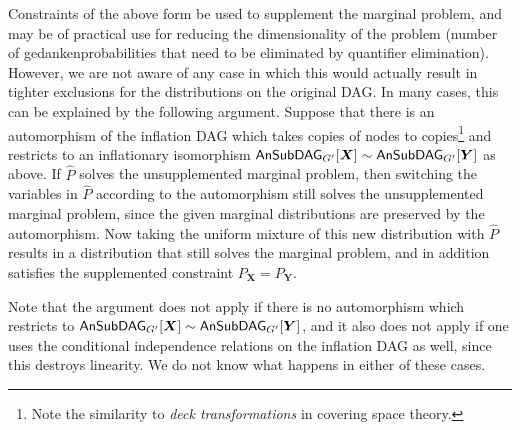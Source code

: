 Constraints of the above form be used to supplement the marginal problem, and may be of practical use for reducing the dimensionality of the problem (number of gedankenprobabilities that need to be eliminated by quantifier elimination). However, we are not aware of any case in which this would actually result in tighter exclusions for the distributions on the original DAG. In many cases, this can be explained by the following argument. Suppose that there is an automorphism of the inflation DAG which takes copies of nodes to copies\footnote{Note the similarity to \emph{deck transformations} in covering space theory.} and restricts to an inflationary isomorphism $\ansubgraph[G']{\bm{X}}\sim\ansubgraph[G']{\bm{Y}}$ as above. If $\hat{P}$ solves the unsupplemented marginal problem, then switching the variables in $\hat{P}$ according to the automorphism still solves the unsupplemented marginal problem, since the given marginal distributions are preserved by the automorphism. Now taking the uniform mixture of this new distribution with $\hat{P}$ results in a distribution that still solves the marginal problem, and in addition satisfies the supplemented constraint $P_{\bm{X}} = P_{\bm{Y}}$.

Note that the argument does not apply if there is no automorphism which restricts to $\ansubgraph[G']{\bm{X}}\sim\ansubgraph[G']{\bm{Y}}$, and it also does not apply if one uses the conditional independence relations on the inflation DAG as well, since this destroys linearity. We do not know what happens in either of these cases.





